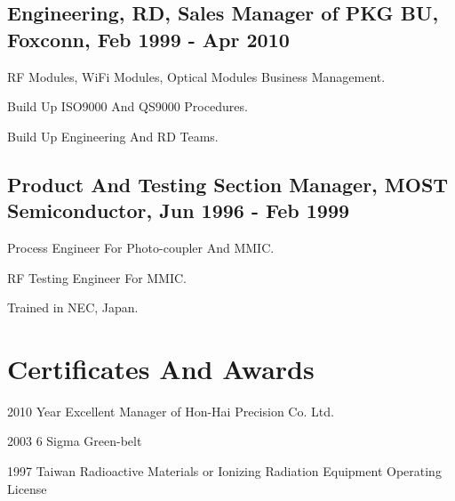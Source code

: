 \documentclass[12pt,a4paper]{report}
\newcommand{\listitemspace}{0.25em} %
\renewenvironment{itemize} %
{\begin{list}{}{\setlength{\leftmargin}{0em}
                \setlength{\parskip}{0em}
                \setlength{\itemsep}{\listitemspace}
                \setlength{\parsep}{\listitemspace}}}
{\end{list}}
\begin{document}
    \subsection*{Engineering, RD, Sales Manager of PKG BU, Foxconn, Feb 1999 - Apr 2010}
    \begin{itemize}
        \item RF Modules, WiFi Modules, Optical Modules Business Management. 
        \item Build Up ISO9000 And QS9000 Procedures.
        \item Build Up Engineering And RD Teams.
    \end{itemize}
    \subsection*{Product And Testing Section Manager, MOST Semiconductor, Jun 1996 - Feb 1999}
    \begin{itemize}
        \item Process Engineer For Photo-coupler And MMIC. 
        \item RF Testing Engineer For MMIC.
        \item Trained in NEC, Japan.
    \end{itemize}

    \section*{Certificates And Awards}
    \begin{tablist}
        \item[2010] \tab{}Year Excellent Manager of Hon-Hai Precision Co. Ltd.
        \item[2003] \tab{}6 Sigma Green-belt 
        \item[1997] \tab{}Taiwan Radioactive Materials or Ionizing Radiation Equipment Operating License
    \end{tablist}
\end{document}

